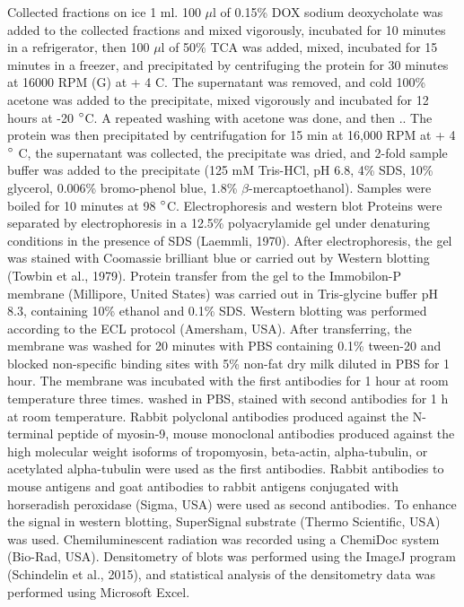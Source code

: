 \documentclass[english,authoryear]{elsarticle}
\begin{document}
Collected fractions on ice 1 ml.
100 $\mu$l of 0.15\% DOX sodium deoxycholate was added to the collected fractions and mixed vigorously, incubated for 10 minutes in a refrigerator, then 100 $\mu$l of 50\% TCA was added, mixed, incubated for 15 minutes in a freezer, and precipitated by centrifuging the protein for 30 minutes at 16000 RPM (G) at + 4 C.
The supernatant was removed, and cold 100\% acetone was added to the precipitate, mixed vigorously and incubated for 12 hours at -20 $\degree$C. A repeated washing with acetone was done, and then ..
The protein was then precipitated by centrifugation for 15 min at 16,000 RPM at + 4 $\degree$ C, the supernatant was collected, the precipitate was dried, and 2-fold sample buffer was added to the precipitate (125 mM Tris-HCl, pH 6.8, 4\% SDS, 10\% glycerol, 0.006\% bromo-phenol blue, 1.8\% $\beta$-mercaptoethanol).
Samples were boiled for 10 minutes at 98 $\degree$C.
Electrophoresis and western blot
Proteins were separated by electrophoresis in a 12.5\%  polyacrylamide gel under denaturing conditions in the presence of SDS (Laemmli, 1970).
After electrophoresis, the gel was stained with Coomassie brilliant blue or carried out by Western blotting (Towbin et al., 1979).
Protein transfer from the gel to the Immobilon-P membrane (Millipore, United States) was carried out in Tris-glycine buffer pH 8.3, containing 10\% ethanol and 0.1\% SDS.
Western blotting was performed according to the ECL protocol (Amersham, USA).
After transferring, the membrane was washed for 20 minutes with PBS containing 0.1\% tween-20 and blocked non-specific binding sites with 5\% non-fat dry milk diluted in PBS for 1 hour.
The membrane was incubated with the first antibodies for 1 hour at room temperature three times. washed in PBS, stained with second antibodies for 1 h at room temperature. Rabbit polyclonal antibodies produced against the N-terminal peptide of myosin-9, mouse monoclonal antibodies produced against the high molecular weight isoforms of tropomyosin, beta-actin, alpha-tubulin, or acetylated alpha-tubulin were used as the first antibodies.
Rabbit antibodies to mouse antigens and goat antibodies to rabbit antigens conjugated with horseradish peroxidase (Sigma, USA) were used as second antibodies.
To enhance the signal in western blotting, SuperSignal substrate (Thermo Scientific, USA) was used.
Chemiluminescent radiation was recorded using a ChemiDoc system (Bio-Rad, USA).
Densitometry of blots was performed using the ImageJ program (Schindelin et al., 2015), and statistical analysis of the densitometry data was performed using Microsoft Excel.
\end{document}
